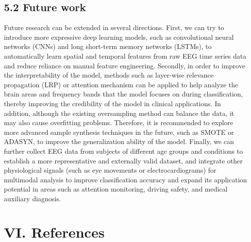 \documentclass[
  doc]{apa6}
\begin{document}
\subsection{5.2 Future work}\label{future-work}

Future research can be extended in several directions. First, we can try to introduce more expressive deep learning models, such as convolutional neural networks (CNNs) and long short-term memory networks (LSTMs), to automatically learn spatial and temporal features from raw EEG time series data and reduce reliance on manual feature engineering. Secondly, in order to improve the interpretability of the model, methods such as layer-wise relevance propagation (LRP) or attention mechanism can be applied to help analyze the brain areas and frequency bands that the model focuses on during classification, thereby improving the credibility of the model in clinical applications. In addition, although the existing oversampling method can balance the data, it may also cause overfitting problems. Therefore, it is recommended to explore more advanced sample synthesis techniques in the future, such as SMOTE or ADASYN, to improve the generalization ability of the model. Finally, we can further collect EEG data from subjects of different age groups and conditions to establish a more representative and externally valid dataset, and integrate other physiological signals (such as eye movements or electrocardiograms) for multimodal analysis to improve classification accuracy and expand its application potential in areas such as attention monitoring, driving safety, and medical auxiliary diagnosis.

\newpage

\section{VI. References}\label{vi.-references}
\end{document}
